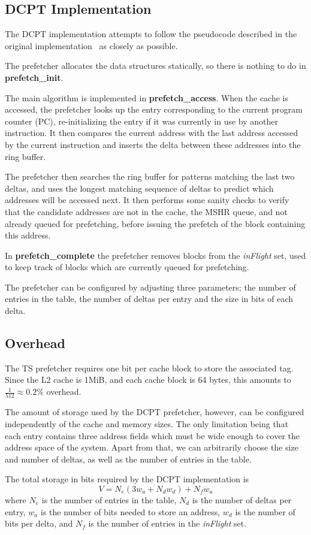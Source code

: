 \subsection{DCPT Implementation}

The DCPT implementation attempts to follow the pseudocode described in the
original implementation~\cite{dcpt} as closely as possible.

The prefetcher allocates the data structures statically, so there is nothing to do in \textbf{prefetch\_init}.

The main algorithm is implemented in \textbf{prefetch\_access}. When the cache
is accessed, the prefetcher looks up the entry corresponding to the current
program counter (PC), re-initializing the entry if it was currently in use by
another instruction. It then compares the current address with the last address
accessed by the current instruction and inserts the delta between these
addresses into the ring buffer.

The prefetcher then searches the ring buffer for patterns matching the last two
deltas, and uses the longest matching sequence of deltas to predict which
addresses will be accessed next. It then performs some sanity checks to verify
that the candidate addresses are not in the cache, the MSHR queue, and not
already queued for prefetching, before issuing the prefetch of the block
containing this address.

In \textbf{prefetch\_complete} the prefetcher removes blocks from the
\emph{inFlight} set, used to keep track of blocks which are currently queued for
prefetching.

The prefetcher can be configured by adjusting three parameters; the number of
entries in the table, the number of deltas per entry and the size in bits of
each delta.

\subsection{Overhead}

The TS prefetcher requires one bit per cache block to store the associated tag.
Since the L2 cache is 1MiB, and each cache block is 64 bytes, this amounts to
$\frac{1}{512} \approx 0.2\%$ overhead.

The amount of storage used by the DCPT prefetcher, however, can be configured
independently of the cache and memory sizes. The only limitation being that each
entry contains three address fields which must be wide enough to cover the
address space of the system. Apart from that, we can arbitrarily choose the size
and number of deltas, as well as the number of entries in the table.

The total storage in bits required by the DCPT implementation is
\begin{equation*}
V = N_e (3 w_a + N_d w_d) + N_f w_a
\end{equation*}
where $N_e$ is the number of entries in the table, $N_d$ is the number of deltas
per entry, $w_a$ is the number of bits needed to store an address, $w_d$ is the
number of bits per delta, and $N_f$ is the number of entries in the
\emph{inFlight} set.
